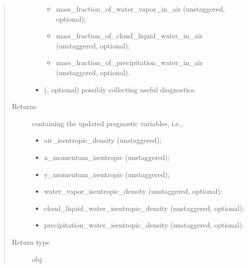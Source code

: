 \documentclass[letterpaper,10pt,english]{sphinxmanual}
\begin{document}
\begin{fulllineitems}
\begin{fulllineitems}
\begin{quote}
\begin{description}
\begin{itemize}
\begin{itemize}
\item {} 
mass\_fraction\_of\_water\_vapor\_in\_air (unstaggered, optional);

\item {} 
mass\_fraction\_of\_cloud\_liquid\_water\_in\_air (unstaggered, optional);

\item {} 
mass\_fraction\_of\_precipitation\_water\_in\_air (unstaggered, optional).

\end{itemize}


\item {} 
 (, optional) \textendash{} {\hyperref[\detokenize{api:storages.grid_data.GridData}]{}} possibly collecting useful diagnostics.

\end{itemize}

\item[{Returns}] \leavevmode

{\hyperref[\detokenize{api:storages.state_isentropic.StateIsentropic}]{}} containing the updated prognostic variables, i.e.,
\begin{itemize}
\item {} 
air\_isentropic\_density (unstaggered);

\item {} 
x\_momentum\_isentropic (unstaggered);

\item {} 
y\_momentum\_isentropic (unstaggered);

\item {} 
water\_vapor\_isentropic\_density (unstaggered, optional);

\item {} 
cloud\_liquid\_water\_isentropic\_density (unstaggered, optional);

\item {} 
precipitation\_water\_isentropic\_density (unstaggered, optional).

\end{itemize}


\item[{Return type}] \leavevmode
obj

\end{description}\end{quote}

\end{fulllineitems}


\end{fulllineitems}
\end{document}
